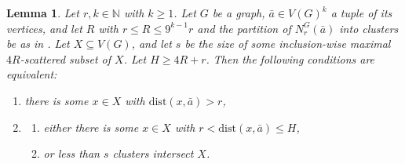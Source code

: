\documentclass[11pt]{article}
\newtheorem{lemma}[theorem]{Lemma}
\theoremstyle{remark}
\def\N{\mathbb N}
\renewcommand{\subset}{\subseteq}
\renewcommand{\le}{\leqslant}
\renewcommand{\ge}{\geqslant}
\newcommand{\dist}{\mathrm{dist}}
\newcommand{\tup}{\bar}
\begin{document}
\begin{lemma}\label{lem:scatter}
    Let \(r,k \in \N\) with $k\ge 1$.
    Let \(G\) be a graph, \(\bar a\in V(G)^k\) a tuple of its  vertices, and
    let $R$ with \(r \le R \le 9^{k-1} r\) and the partition of $N_r^G(\bar a)$ into clusters be as in .
    Let $X\subset V(G)$, and let $s$ be the size of some inclusion-wise maximal $4R$-scattered subset of $X$. Let $H\ge 4R+r$.
    Then the following conditions are equivalent:
\begin{enumerate}
    \item there is some $x\in X$ with $\dist(x,\tup a)>r$,

    \item
    \begin{enumerate}
        \item either there is some $x\in X$ with $r<\dist(x,\tup a)\le H$,

        \item or less than $s$ clusters intersect $X$.
    \end{enumerate}
\end{enumerate}
\end{lemma}
\end{document}
